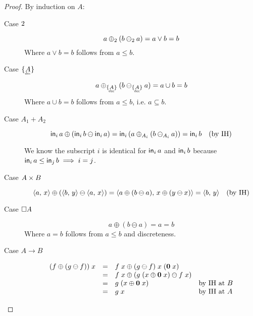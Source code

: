 \documentclass{article}
\theoremstyle{plain}
\theoremstyle{definition}
\begin{document}
\begin{proof}
  By induction on $A$:
  \begin{description}
    \item[Case $2$]
      \begin{equation*}
      a \oplus_2 (b \ominus_2 a) = a \vee b = b
      \end{equation*}
      Where $a \vee b = b$ follows from $a \le b$.

    \item[Case $\Seteq{A}$]
      \begin{equation*}
        a \oplus_{\Seteq{A}} (b \ominus_{\Seteq{A}} a)
        = a \cup b
        = b
      \end{equation*}
      Where $a \cup b = b$ follows from $a \le b$, i.e. $a \subseteq b$.

    \item[Case $A_1 + A_2$]
      \begin{equation*}
        \mathsf{in}_{i}\,{a} \oplus (\mathsf{in}_{i}\,{b} \ominus \mathsf{in}_{i}\,{a})
        = \mathsf{in}_{i}\,{(a \oplus_{A_i} (b \ominus_{A_i} a))}
        = \mathsf{in}_{i}\,{b}  \quad\text{(by IH)}
      \end{equation*}

      We know the subscript $i$ is identical for $\mathsf{in}_{i}\,{a}$ and $\mathsf{in}_{i}\,{b}$
      because $\mathsf{in}_{i}\,{a} \le \mathsf{in}_{j}\,{b} \implies i = j$.

    \item[Case $A \times B$]
      \begin{equation*}
        \langle{{a},\,{x}}\rangle \oplus (\langle{{b},\,{y}}\rangle \ominus \langle{{a},\,{x}}\rangle)
        = \langle{{a \oplus (b \ominus a)},\,{x \oplus (y \ominus x)}}\rangle
        = \langle{{b},\,{y}}\rangle \quad\text{(by IH)}
      \end{equation*}

    \item[Case $\square{A}$]
      \begin{equation*}
        a \oplus (b \ominus a) = a = b
      \end{equation*}
      Where $a = b$ follows from $a \le b$ and discreteness.


    \item[Case $A \to B$]
      \[\begin{array}{rcll}
      (f \oplus (g \ominus f))\; x
      &=& f\;x \oplus (g \ominus f)\; x\; (\mathbf{0}\; x)\\
      &=& f\;x \oplus (g \; (x \oplus \mathbf{0}\; x) \ominus f \; x)\\
      &=& g\; (x \oplus \mathbf{0}\; x) & \text{by IH at $B$}\\
      &=& g\; x & \text{by IH at $A$}
      \end{array}\]

  \end{description}
\end{proof}
\end{document}
